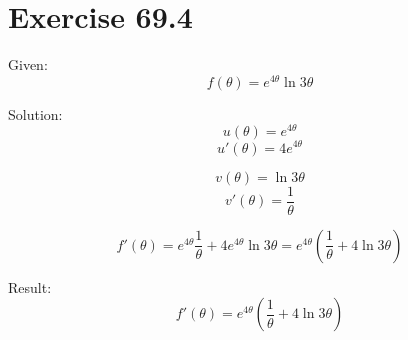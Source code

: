 \documentclass[a4paper, 10pt]{scrartcl}
\begin{document}
\section{Exercise 69.4}

Given:
\[f(\theta) = e^{4\theta}\ln{3\theta}\]

Solution:
\[u(\theta) = e^{4\theta}\]
\[u'(\theta) = 4e^{4\theta}\]

\[v(\theta) = \ln{3\theta}\]
\[v'(\theta) = \frac{1}{\theta}\]

\[f'(\theta) = e^{4\theta}\frac{1}{\theta} + 4e^{4\theta}\ln{3\theta} =
               e^{4\theta}(\frac{1}{\theta} + 4\ln{3\theta})\]

Result:
\[f'(\theta) = e^{4\theta}(\frac{1}{\theta} + 4\ln{3\theta})\]
\end{document}
